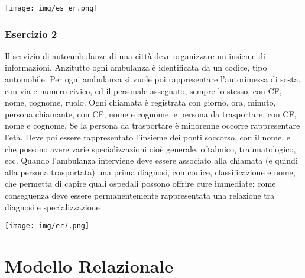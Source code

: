 \documentclass[a4paper]{article}
\begin{document}
\begin{center}
  \texttt{[image: img/es\_er.png]}
\end{center}\par \subsubsection{Esercizio 2}
Il servizio di autoambulanze di una città deve organizzare un insieme di informazioni. Anzitutto ogni ambulanza è identificata da un codice, tipo automobile. Per ogni ambulanza si vuole poi rappresentare l'autorimessa di sosta, con via e numero civico, ed il personale assegnato, sempre lo stesso, con CF, nome, cognome, ruolo. Ogni chiamata è registrata con giorno, ora, minuto, persona chiamante, con CF, nome e cognome, e persona da trasportare, con CF, nome e cognome. Se la persona da trasportare è minorenne occorre rappresentare l'età. Deve poi essere rappresentato l'insieme dei ponti soccorso, con il nome, e che possono avere varie specializzazioni cioè generale, oftalmico, traumatologico, ecc. Quando l'ambulanza interviene deve essere associato alla chiamata (e quindi alla persona trasportata) una prima diagnosi, con codice, classificazione e nome, che permetta di capire quali ospedali possono offrire cure immediate; come conseguenza deve essere permanentemente rappresentata una relazione tra diagnosi e specializzazione
\begin{center}
      \texttt{[image: img/er7.png]}
\end{center}
\section{Modello Relazionale}
\end{document}
